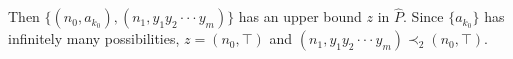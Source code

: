 \documentclass[preprint,12pt]{elsarticle}
\numberwithin{equation}{section}
\begin{document}
 Then $\{(n_{0},a_{k_{0}}),(n_{1},y_{1}y_{2}\cdot\cdot\cdot y_{m})\}$ has an upper bound $z$ in $\widehat{P}$. Since $\{a_{k_{0}}\}$ has infinitely many possibilities, $z=(n_{0},\top)$ and $(n_{1},y_{1}y_{2}\cdot\cdot\cdot y_{m})\prec_{2} (n_{0},\top)$.









\end{document}
